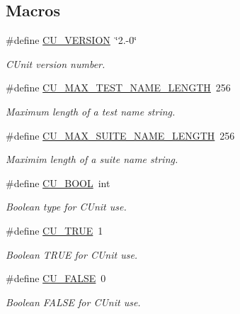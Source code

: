 \subsection*{Macros}
\begin{DoxyCompactItemize}
\item 
\#define \hyperlink{group___framework_gaac14cadefd27f1bb23db3ab4b104ee54}{C\+U\+\_\+\+V\+E\+R\+S\+I\+O\+N}~\char`\"{}2.-\/0\char`\"{}
\begin{DoxyCompactList}\small\item\em C\+Unit version number. \end{DoxyCompactList}\item 
\#define \hyperlink{group___framework_ga9a099de9abf9b1b3650734feea06ac5c}{C\+U\+\_\+\+M\+A\+X\+\_\+\+T\+E\+S\+T\+\_\+\+N\+A\+M\+E\+\_\+\+L\+E\+N\+G\+T\+H}~256
\begin{DoxyCompactList}\small\item\em Maximum length of a test name string. \end{DoxyCompactList}\item 
\#define \hyperlink{group___framework_gae31e7ab4133f02f9631a83414994165f}{C\+U\+\_\+\+M\+A\+X\+\_\+\+S\+U\+I\+T\+E\+\_\+\+N\+A\+M\+E\+\_\+\+L\+E\+N\+G\+T\+H}~256
\begin{DoxyCompactList}\small\item\em Maximim length of a suite name string. \end{DoxyCompactList}\item 
\#define \hyperlink{group___framework_gabd98d449e979a6379b06551242106dd4}{C\+U\+\_\+\+B\+O\+O\+L}~int
\begin{DoxyCompactList}\small\item\em Boolean type for C\+Unit use. \end{DoxyCompactList}\item 
\#define \hyperlink{group___framework_ga99641394bc766ca9c4a295e942fed1ef}{C\+U\+\_\+\+T\+R\+U\+E}~1
\begin{DoxyCompactList}\small\item\em Boolean T\+R\+U\+E for C\+Unit use. \end{DoxyCompactList}\item 
\#define \hyperlink{group___framework_ga7453214541b156ef868681eaafe60860}{C\+U\+\_\+\+F\+A\+L\+S\+E}~0
\begin{DoxyCompactList}\small\item\em Boolean F\+A\+L\+S\+E for C\+Unit use. \end{DoxyCompactList}\item 

\end{DoxyCompactItemize}
